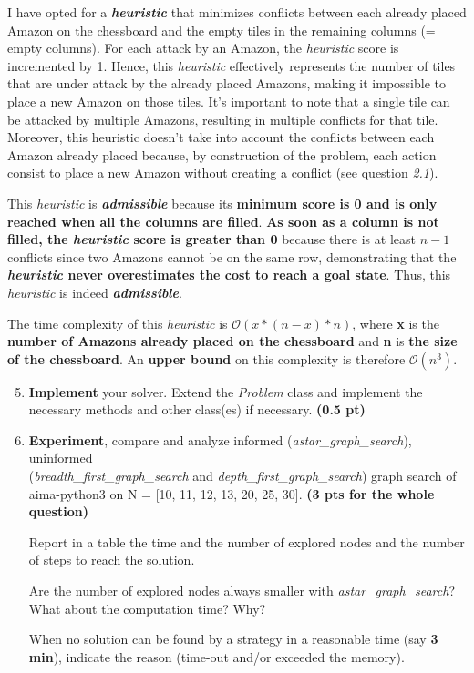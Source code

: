 \documentclass[11pt,a4paper]{report}
\begin{document}
\begin{answers}[5cm]
\footnotesize{I have opted for a \textbf{\textit{heuristic}} that minimizes conflicts between each already placed Amazon on the chessboard and the empty tiles in the remaining columns (= empty columns). For each attack by an Amazon, the \textit{heuristic} score is incremented by 1. Hence, this \textit{heuristic} effectively represents the number of tiles that are under attack by the already placed Amazons, making it impossible to place a new Amazon on those tiles. It's important to note that a single tile can be attacked by multiple Amazons, resulting in multiple conflicts for that tile. Moreover, this heuristic doesn't take into account the conflicts between each Amazon already placed because, by construction of the problem, each action consist to place a new Amazon without creating a conflict (see question \textit{2.1}).

This \textit{heuristic} is \textbf{\textit{admissible}} because its \textbf{minimum score is 0 and is only reached when all the columns are filled}. \textbf{As soon as a column is not filled, the \textit{heuristic} score is greater than 0} because there is at least $n - 1$ conflicts since two Amazons cannot be on the same row, demonstrating that the \textbf{\textit{heuristic} never overestimates the cost to reach a goal state}. Thus, this \textit{heuristic} is indeed \textbf{\textit{admissible}}.

The time complexity of this \textit{heuristic} is $\mathcal{O}(x*(n-x)*n)$, where \textbf{x} is the \textbf{number of Amazons already placed on the chessboard} and \textbf{n} is \textbf{the size of the chessboard}. An \textbf{upper bound} on this complexity is therefore $\mathcal{O}(n^3)$.}
\end{answers}

\begin{enumerate}
\setcounter{enumi}{4}
\item \textbf{Implement} your solver. Extend the \emph{Problem} class and implement 
		the necessary methods and other class(es) if necessary.  \textbf{(0.5 pt)}
\item \textbf{Experiment}, compare and analyze informed (\emph{astar\_graph\_search}), uninformed \\
    (\emph{breadth\_first\_graph\_search} and \emph{depth\_first\_graph\_search}) graph search of aima-python3 on N = [10, 11, 12, 13, 20, 25, 30]. \textbf{(3 pts for the whole question)}
		
		Report in a table the time and the number of explored nodes and the number of 
		steps to reach the solution.
		
		Are the number of explored nodes always smaller with 
		\emph{astar\_graph\_search}? 
		What about the computation time? 
		Why? 
		 
		 When no solution can be found by a strategy in a reasonable time (say \textbf{3 
		 min}), indicate the reason (time-out and/or exceeded the memory).
\end{enumerate}
\end{document}
